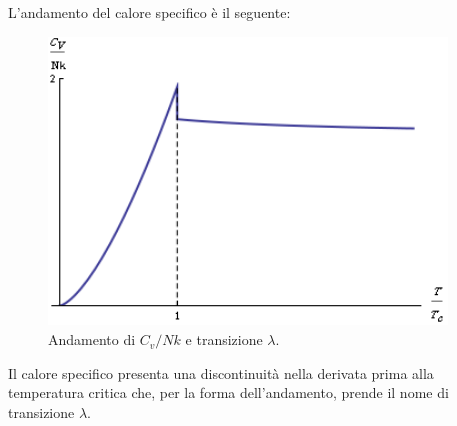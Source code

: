 \documentclass[10pt,a4paper]{report}
\theoremstyle{definition}
\numberwithin{equation}{section}
\begin{document}
L'andamento del calore specifico è il seguente:
\begin{figure}[h]
\centering
\includegraphics[width=300pt,keepaspectratio=true]{Addons/lambdatransition}
\caption{Andamento di $C_v/Nk$ e transizione $\lambda$.}
\end{figure}
\pagebreak

Il calore specifico presenta una discontinuità nella derivata prima alla temperatura critica che, per la forma dell'andamento, prende il nome di transizione $\lambda$.
\end{document}
